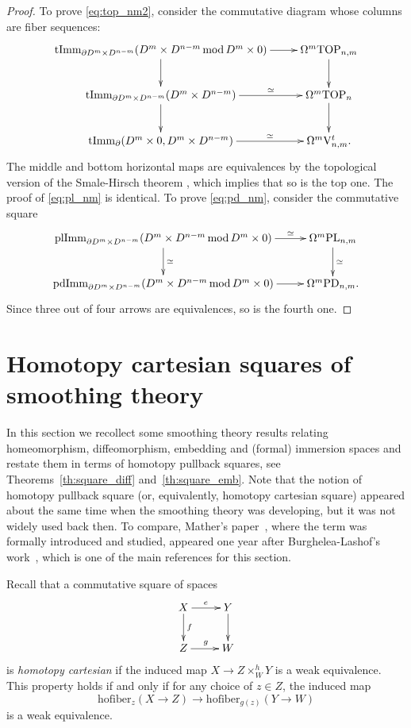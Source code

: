 \documentclass[11pt]{amsart}
\theoremstyle{definition}
\newcommand{\tImm}{\mathrm{tImm}}
\newcommand{\plImm}{\mathrm{plImm}}
\newcommand{\pdImm}{\mathrm{pdImm}}
\newcommand{\PL}{\mathrm{PL}}
\newcommand{\TOP}{\mathrm{TOP}}
\newcommand{\PD}{\mathrm{PD}}
\newcommand{\VV}{\mathrm{V}}
\newcommand{\mmod}{\,\mathrm{mod}\,}
\newcommand{\hofiber}{\mathrm{hofiber}}
\numberwithin{equation}{section}
\begin{document}
\begin{proof}
To prove \eqref{eq:top_nm2}, consider the commutative diagram whose columns are fiber sequences:
\[
\xymatrix{
\tImm_{\partial D^m\times D^{n-m}}(D^m\times D^{n-m}\mmod D^m\times 0)\ar[d]\ar[r]&\Omega^m\TOP_{n,m}\ar[d]\\
\tImm_{\partial D^m\times D^{n-m}}(D^m\times D^{n-m})\ar[r]^-{\simeq}\ar[d]&\Omega^m\TOP_{n}\ar[d]\\
\tImm_\partial(D^m\times 0,D^m\times D^{n-m})\ar[r]^-\simeq&\Omega^m\VV_{n,m}^t.
}
\]
The middle and bottom horizontal maps are equivalences by the topological version of the Smale-Hirsch theorem \cite{Lees,Kurata}, which implies that so is the top
one. The proof of  \eqref{eq:pl_nm} is identical. To prove \eqref{eq:pd_nm}, consider the commutative square
\[
\xymatrix{
\plImm_{\partial D^m\times D^{n-m}}(D^m\times D^{n-m}\mmod D^m\times 0)\ar[d]^-\simeq\ar[r]^-\simeq&\Omega^m\PL_{n,m}\ar[d]^-\simeq\\
\pdImm_{\partial D^m\times D^{n-m}}(D^m\times D^{n-m}\mmod D^m\times 0)\ar[r]&\Omega^m\PD_{n,m}.
}
\]
Since three out of four arrows are equivalences, so is the fourth one.
\end{proof}





\section{Homotopy cartesian squares of smoothing theory}\label{s:squares}
In this section we recollect some smoothing theory results relating homeomorphism, diffeomorphism, embedding  and (formal) immersion spaces and restate them  in terms of homotopy pullback squares, see Theorems~\ref{th:square_diff} and~\ref{th:square_emb}.  Note that the notion of homotopy pullback square (or, equivalently, homotopy cartesian square) appeared about the same time when the smoothing theory was developing, but it 
was not widely used back then. To compare,
Mather's paper~\cite{Mather}, where the term was formally introduced and studied, appeared one year after Burghelea-Lashof's work~\cite{BL_diff}, which is one of the main references for this section. 



Recall that a commutative square of spaces
\begin{equation}\label{eq:square}
\xymatrix{
X\ar[d]^-f\ar[r]^e&Y\ar[d]\\
Z\ar[r]^g&W
}
\end{equation}
is {\it homotopy cartesian} if the induced map $X\to Z\times^h_W Y$ is a weak equivalence. This property holds if and only if for any choice of $z\in Z$, the induced map
\begin{equation}\label{eq:map_of_fibers}
\hofiber_z(X\to Z)\to \hofiber_{g(z)}(Y\to W)
\end{equation}
is a weak equivalence. 
\end{document}
